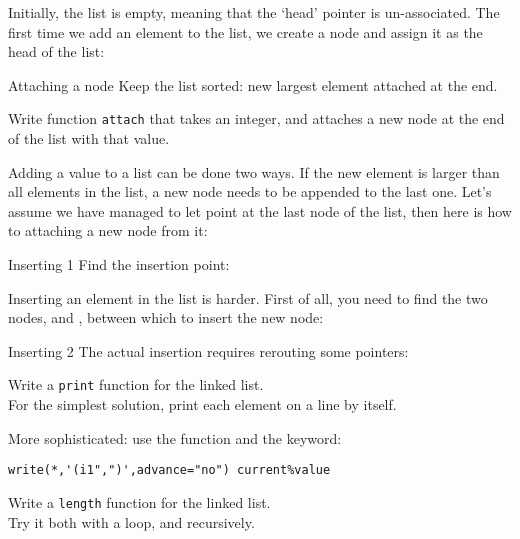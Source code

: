 Initially, the list is empty, meaning that the `head' pointer is
un-associated. The first time we add an element to the list, we create
a node and assign it as the head of the list:
%

\begin{block}{Attaching a node}
  \label{sl:flink4}
  Keep the list sorted: new largest element attached at the end.
  
\end{block}

\begin{exercise}
  \label{ex:flist-attach}
  Write function \lstinline{attach} that takes an integer, and
  attaches a new node at the end of the list with that value.
\end{exercise}

Adding a value to a list can be done two ways. If the new element is
larger than all elements in the list, a new node needs to be appended
to the last one. Let's assume we have managed
to let  point at the last node of the list,
then here is how to 
attaching a new node from it:
%

\begin{block}{Inserting 1}
  \label{sl:flink5}
  Find the insertion point:
\end{block}

Inserting an element in the list is harder.
First of all, you need to find the two nodes,
 and , between which to insert the new node:
%

\begin{block}{Inserting 2}
  \label{sl:flink6}
  The actual insertion requires rerouting some pointers:
\end{block}

\begin{exercise}
  \label{ex:flist-print}
  Write a \lstinline{print} function for the linked list.\\
  For the simplest solution, print each element on a line by itself.

  More sophisticated: use the  function and the
   keyword:
\begin{lstlisting}
write(*,'(i1",")',advance="no") current%value  
\end{lstlisting}
\end{exercise}

\begin{exercise}
  \label{ex:flist-length}
  Write a \lstinline{length} function for the linked list.\\
  Try it both with a loop, and recursively.
\end{exercise}


